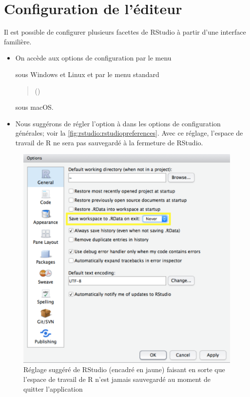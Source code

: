 \section{Configuration de l'éditeur}
\label{rstudio:configuration}

Il est possible de configurer plusieurs facettes de RStudio à partir
d'une interface familière.
\begin{itemize}
\item On accède aux options de configuration par le menu
  \begin{quote}
  \end{quote}
  sous Windows et Linux et par le menu standard
  \begin{quote}
     (\code{\cmdkey\,,})
  \end{quote}
  sous macOS.
\item Nous suggérons de régler l'option  à  dans les options de configuration
  générales; voir la \autoref{fig:rstudio:rstudiopreferences}. Avec ce
  réglage, l'espace de travail de R ne sera pas sauvegardé à la
  fermeture de RStudio.
\end{itemize}

\begin{figure}
  \centering
  \includegraphics{rstudiopreferences-screenshot}
  \caption{Réglage suggéré de RStudio (encadré en jaune) faisant en
    sorte que l'espace de travail de R n'est jamais sauvegardé au
    moment de quitter l'application}
  \label{fig:rstudio:rstudiopreferences}
\end{figure}


